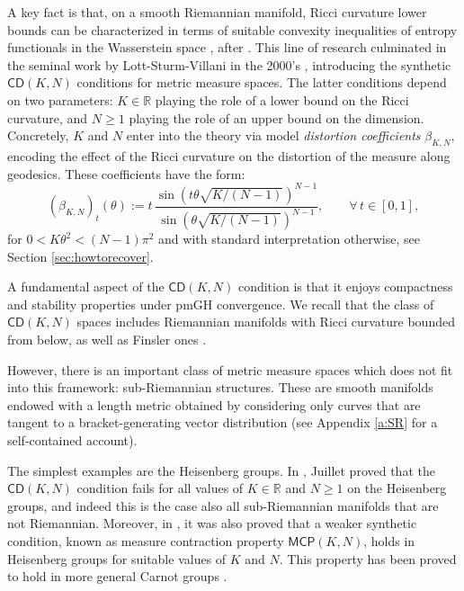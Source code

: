 \documentclass[11pt,a4paper]{article}
\theoremstyle{plain}
\theoremstyle{definition}
\theoremstyle{remark}
\numberwithin{equation}{section}
\newcommand{\R}{\mathbb{R}} %
\newcommand{\CD}{\mathsf{CD}}
\newcommand{\MCP}{\mathsf{MCP}}
\begin{document}
A key fact is that, on a smooth Riemannian manifold, Ricci curvature lower bounds can be characterized in terms of suitable convexity inequalities of entropy functionals in the Wasserstein space \cite{CEMS,vRSt}, after \cite{McC97, OttoVillani}.  
This line of research culminated in the seminal work by Lott-Sturm-Villani in the 2000's \cite{lottvillani:metric,sturm:I,sturm:II}, introducing the synthetic $\CD(K,N)$ conditions for metric measure spaces. The latter conditions depend on two parameters: $K\in \R$ playing the role of a lower bound on the Ricci curvature, and $N\geq 1$ playing the role of an upper bound on the dimension. Concretely, $K$ and $N$ enter into the theory via model  \emph{distortion coefficients} $\beta_{K,N}$, encoding the effect of the Ricci curvature on the distortion of the measure along geodesics. These coefficients have the form:
\begin{equation}\label{eq:defbetaKNK>0}
 (\beta_{K,N})_t(\theta) :=
 t  \, \frac{\sin\left(t\theta \sqrt{K/(N-1)}\right)^{N-1}}{\sin\left(\theta \sqrt{K/(N-1)}\right)^{N-1}}, \qquad  \forall\,t\in [0,1],
\end{equation}
for  $0<K\theta^2<(N-1)\pi^2$ and with standard interpretation otherwise, see Section \ref{sec:howtorecover}.

A fundamental aspect of the $\CD(K,N)$ condition is that it enjoys compactness and stability properties under pmGH convergence. We recall that the class of $\CD(K,N)$ spaces includes Riemannian manifolds with Ricci curvature bounded from below, as well as Finsler ones \cite{Ohta2009}. 

However, there is an important class of metric measure spaces which does not fit into this framework: sub-Riemannian structures. These are smooth manifolds endowed with a length metric obtained by considering only curves that are tangent to a bracket-generating vector distribution (see Appendix \ref{a:SR} for a self-contained account).

The simplest examples are the Heisenberg groups. In \cite{NJ09}, Juillet proved that the $\CD(K,N)$ condition fails for all values of $K\in \R$ and $N\geq 1$ on the Heisenberg groups, and indeed this is the case also all sub-Riemannian manifolds \cite{AmbStef, NJ21, MagnaRossi22, RS-Failure} that are not Riemannian.  Moreover, in \cite{NJ09}, it was also proved that a weaker synthetic condition, known as measure contraction property $\MCP(K,N)$, holds in Heisenberg groups for suitable values of $K$ and $N$. This property has been proved to hold in more general Carnot groups \cite{BR-realanalMCP, RiffordCarnot}.
\end{document}
